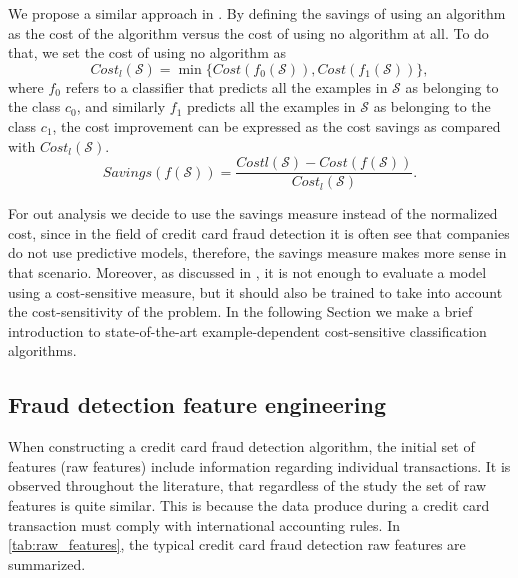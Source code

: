 	We propose a similar approach in \citep{CorreaBahnsen2015}. By defining the savings of using an 
	algorithm as the cost of the algorithm versus the cost of using no algorithm at all. 
	To do that, we set the cost of using no algorithm as 
	\begin{equation}
		Cost_l(\mathcal{S}) = \min \{Cost(f_0(\mathcal{S})), Cost(f_1(\mathcal{S}))\},
	\end{equation}
	where $f_0$ refers to a classifier that predicts all the examples in $\mathcal{S}$ as belonging 
	to the class $c_0$, and similarly $f_1$ 	predicts all the examples in $\mathcal{S}$ as belonging 
	to the class $c_1$, the cost improvement 	can be expressed as the cost savings as compared with 
	$Cost_l(\mathcal{S})$. 
  \begin{equation}\label{eq:savings}
    Savings(f(\mathcal{S})) = \frac{ Costl(\mathcal{S}) - 
		Cost(f(\mathcal{S}))}{Cost_l(\mathcal{S})}.
  \end{equation} 

	For out analysis we decide to use the savings measure instead of the normalized cost, since in 
	the field of credit card fraud detection it is often see that companies do not use predictive 
	models, therefore, the savings measure makes more sense in that scenario.
	Moreover, as discussed in \citep{CorreaBahnsen2013}, it is not enough to evaluate a model using a 
	cost-sensitive measure, but it should also be trained to take into account the cost-sensitivity 
	of the problem. In the following Section we make a brief introduction to state-of-the-art 
	example-dependent cost-sensitive classification algorithms.

	
\subsection{Fraud detection feature engineering}
\label{sec:4:frad:features}

	When constructing a credit card fraud detection algorithm, the initial set of features (raw 
	features) include information regarding individual transactions. It is observed throughout the 
	literature, that regardless of the study the set of raw features is quite similar. This is 
	because the data produce during a credit card transaction must comply with international 
	accounting rules. In \tablename{ \ref{tab:raw_features}}, the typical credit card fraud detection 
	raw features are summarized.
	
